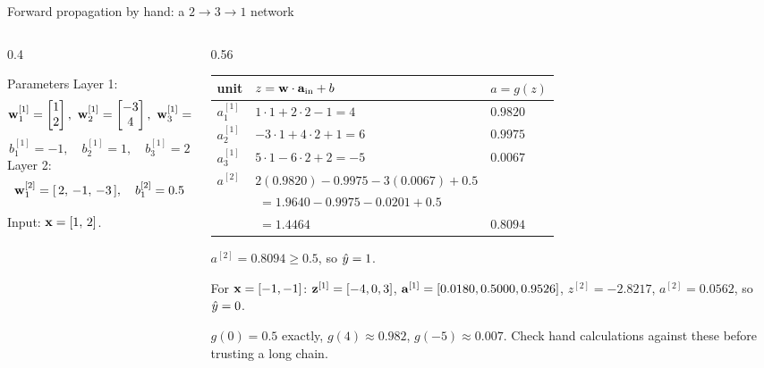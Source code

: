 \documentclass[aspectratio=169,10pt]{beamer}
\begin{document}
\begin{frame}{Forward propagation by hand: a $2\to3\to1$ network}
  \footnotesize
  \begin{columns}[T,onlytextwidth]
    \begin{column}{0.4\textwidth}
      \begin{block}{Parameters}
        Layer 1:\vspace{-1mm}
        \[ \mathbf{w}^{[1]}_1=\begin{bmatrix}1\\2\end{bmatrix},\
           \mathbf{w}^{[1]}_2=\begin{bmatrix}-3\\4\end{bmatrix},\
           \mathbf{w}^{[1]}_3=\begin{bmatrix}5\\-6\end{bmatrix} \]
        \vspace{-2mm}
        \[ b^{[1]}_1=-1,\quad b^{[1]}_2=1,\quad b^{[1]}_3=2 \]
        Layer 2:\vspace{-1mm}
        \[ \mathbf{w}^{[2]}_1=[\,2,\,-1,\,-3\,],\quad b^{[2]}_1=0.5 \]
      \end{block}
      Input: $\mathbf{x}=[1,\,2]$.
    \end{column}
    \begin{column}{0.56\textwidth}
      \renewcommand{\arraystretch}{1.2}
      \begin{tabular}{@{}lll@{}}
        \toprule
        unit & $z = \mathbf{w}\cdot\mathbf{a}_{\text{in}}+b$ & $a=g(z)$\\
        \midrule
        $a^{[1]}_1$ & $1\cdot1+2\cdot2-1=4$       & $0.9820$\\
        $a^{[1]}_2$ & $-3\cdot1+4\cdot2+1=6$      & $0.9975$\\
        $a^{[1]}_3$ & $5\cdot1-6\cdot2+2=-5$      & $0.0067$\\
        \midrule
        $a^{[2]}$   & $2(0.9820)-0.9975-3(0.0067)+0.5$ & \\
                    & $\;=1.9640-0.9975-0.0201+0.5$ & \\
                    & $\;=1.4464$                       & $\mathbf{0.8094}$\\
        \bottomrule
      \end{tabular}
      \vspace{1mm}

      $a^{[2]}=0.8094\ge0.5$, so $\hat{y}=1$.\par
      \vspace{1mm}
      For $\mathbf{x}=[-1,-1]$: $\mathbf{z}^{[1]}=[-4,0,3]$, $\mathbf{a}^{[1]}=[0.0180,0.5000,0.9526]$,
      $z^{[2]}=-2.8217$, $a^{[2]}=0.0562$, so $\hat{y}=0$.
      \begin{pitfall}[Sanity anchor]
        \footnotesize $g(0)=0.5$ exactly, $g(4)\approx0.982$, $g(-5)\approx0.007$. Check
        hand calculations against these before trusting a long chain.
      \end{pitfall}
    \end{column}
  \end{columns}
\end{frame}
\end{document}
